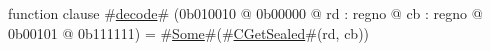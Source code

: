 function clause #\hyperref[zdecode]{decode}# (0b010010 @ 0b00000 @ rd : regno @ cb : regno @    0b00101 @ 0b111111) = #\hyperref[zSome]{Some}#(#\hyperref[zCGetSealed]{CGetSealed}#(rd, cb))
